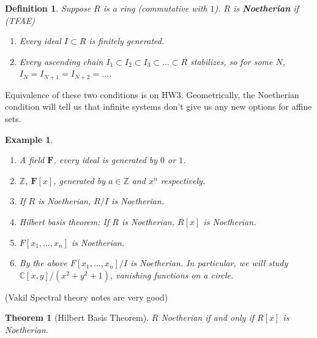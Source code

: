 \documentclass[12pt]{article}
\newcommand{\F}{\mathbf{F}}
\newcommand{\C}{\mathbb{C}}
\newcommand{\Z}{\mathbb{Z}}
\newtheorem{definition}{Definition}[section]
\newtheorem*{example}{Example}
\newtheorem{theorem}{Theorem}[section]
\begin{document}
    \begin{definition}
        Suppose $R$ is a ring (commutative with $1$). $R$ is \textbf{Noetherian} if (TFAE)
        \begin{enumerate}
            \item Every ideal $I \subset R$ is finitely generated. 
            \item Every ascending chain $I_1 \subset I_2 \subset I_3 \subset \dots \subset R$ stabilizes, so for some $N$, $I_{N} = I_{N+1} = I_{N+2} = \dots$. 
        \end{enumerate} 
    \end{definition}
    Equivalence of these two conditions is on HW3. Geometrically, the Noetherian condition will tell us that infinite systems don't give us any new options for affine sets. \par 
    \begin{example}
        \begin{enumerate}
            \item A field $\F$, every ideal is generated by $0$ or $1$. 
            \item $\Z$, $\F[x]$, generated by $a \in \Z$ and $x^n$ respectively. 
            \item If $R$ is Noetherian, $R/I$ is Noetherian. 
            \item Hilbert basis theorem: If $R$ is Noetherian, $R[x]$ is Noetherian. 
            \item $F[x_1, \dots, x_n]$ is Noetherian. 
            \item By the above $F[x_1, \dots, x_n]/I$ is Noetherian. In particular, we will study $\C[x, y]/(x^2 + y^2 + 1)$, vanishing functions on a circle. 
        \end{enumerate}
    \end{example}
    (Vakil Spectral theory notes are very good)\par 
    \begin{theorem}
        [Hilbert Basis Theorem] $R$ Noetherian if and only if $R[x]$ is Noetherian. 
    \end{theorem}
\end{document}
